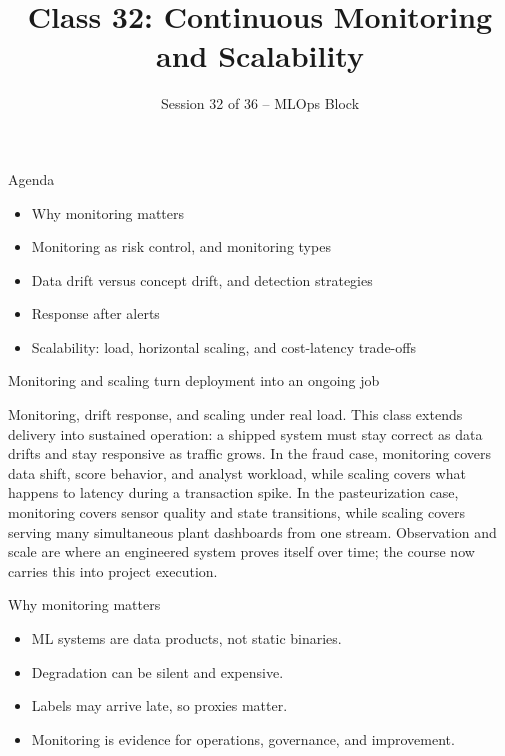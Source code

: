 

\title{Class 32: Continuous Monitoring and Scalability}
\subtitle{Session 32 of 36 -- MLOps Block}
\author{\coursename}
\date{}



\frame{\titlepage \coursefooter}

\begin{frame}{Agenda}
\begin{itemize}
\item Why monitoring matters
\item Monitoring as risk control, and monitoring types
\item Data drift versus concept drift, and detection strategies
\item Response after alerts
\item Scalability: load, horizontal scaling, and cost-latency trade-offs
\end{itemize}
\coursefooter
\end{frame}

\begin{frame}{Monitoring and scaling turn deployment into an ongoing job}
\coursefooter
\end{frame}

\coursecontextframe
{Monitoring, drift response, and scaling under real load.}
{This class extends delivery into sustained operation: a shipped system must stay correct as data drifts and stay responsive as traffic grows.}
{In the fraud case, monitoring covers data shift, score behavior, and analyst workload, while scaling covers what happens to latency during a transaction spike.}
{In the pasteurization case, monitoring covers sensor quality and state transitions, while scaling covers serving many simultaneous plant dashboards from one stream.}
{Observation and scale are where an engineered system proves itself over time; the course now carries this into project execution.}

\begin{frame}{Why monitoring matters}
\begin{itemize}
\item ML systems are data products, not static binaries.
\item Degradation can be silent and expensive.
\item Labels may arrive late, so proxies matter.
\item Monitoring is evidence for operations, governance, and improvement.
\end{itemize}
\coursefooter
\end{frame}

